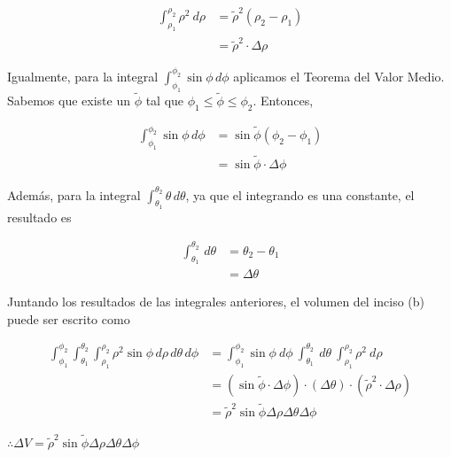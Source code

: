 \documentclass[12pt]{exam}
\begin{document}
\begin{questions}
  \begin{align*}
    \int_{\rho_1}^{\rho_2} \rho^2 ~ d\rho 
    &= \tilde{\rho}^2 (\rho_2 - \rho_1) \\
    &= \tilde{\rho}^2 \cdot \Delta \rho
  \end{align*}

  Igualmente, para la integral $\int_{\phi_1}^{\phi_2} \sin{\phi} \, d\phi$ aplicamos el Teorema del Valor Medio.
  Sabemos que existe un $\tilde{\phi}$ tal que $\phi_1 \leq \tilde{\phi} \leq \phi_2$. Entonces,

  \begin{align*}
    \int_{\phi_1}^{\phi_2} \sin{\phi} \, d\phi
    &= \sin{\tilde{\phi}} (\phi_2 - \phi_1) \\
    &= \sin{\tilde{\phi}} \cdot \Delta \phi
  \end{align*}

  Además, para la integral $\int_{\theta_1}^{\theta_2} \theta \, d\theta$, ya que el integrando es una constante, el resultado es 

  \begin{align*}
    \int_{\theta_1}^{\theta_2}  \, d\theta
    &= \theta_2 - \theta_1 \\
    &= \Delta \theta
  \end{align*}

  Juntando los resultados de las integrales anteriores, el volumen del inciso (b) puede ser escrito como

  \begin{align*}
    \int_{\phi_1}^{\phi_2} \int_{\theta_1}^{\theta_2} \int_{\rho_1}^{\rho_2} \rho^2 \sin{\phi} \, d\rho \, d\theta \, d\phi 
    &= \int_{\phi_1}^{\phi_2} \sin{\phi} ~d\phi ~ \int_{\theta_1}^{\theta_2} ~d\theta ~ \int_{\rho_1}^{\rho_2} \rho^2 ~d\rho \\
    &= (\sin{\tilde{\phi}} \cdot \Delta \phi) \cdot (\Delta \theta) \cdot (\tilde{\rho}^2 \cdot \Delta \rho) \\
    &= \tilde{\rho}^2 \sin{\tilde{\phi}} \Delta \rho \Delta \theta \Delta \phi
  \end{align*}

  $\therefore \Delta V = \tilde{\rho}^2 \sin{\tilde{\phi}} \Delta \rho \Delta \theta \Delta \phi$

\end{questions}
\end{document}

